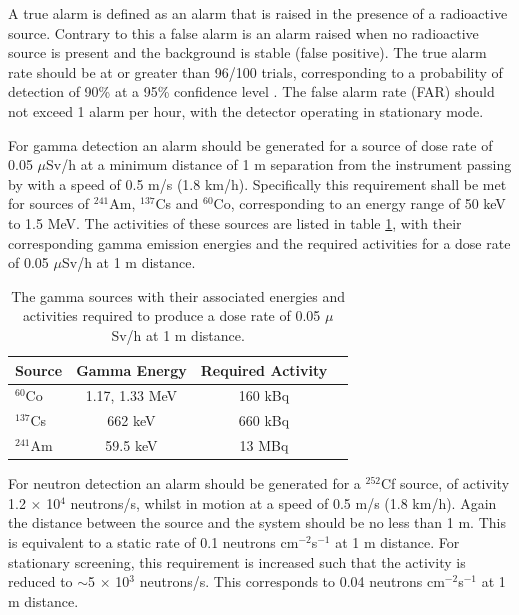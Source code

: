 A true alarm is defined as an alarm that is raised in the presence of a radioactive source. Contrary to this a false alarm is an alarm raised when no radioactive source is present and the background is stable (false positive). The true alarm rate should be at or greater than 96/100 trials, corresponding to a probability of detection of 90\% at a 95\% confidence level \cite{passFailStats}. The false alarm rate (FAR) should not exceed 1 alarm per hour, with the detector operating in stationary mode.

For gamma detection an alarm should be generated for a source of dose rate of 0.05 $\mu$Sv/h at a minimum distance of 1 m separation from the instrument passing by with a speed of 0.5 m/s (1.8 km/h). Specifically this requirement shall be met for sources of $^{241}$Am, $^{137}$Cs and $^{60}$Co, corresponding to an energy range of 50 keV to 1.5 MeV. The activities of these sources are listed in table \ref{tab:gammaSourcesDetection}, with their corresponding gamma  emission energies and the required activities for a dose rate of 0.05 $\mu$Sv/h at 1 m distance.

\begin{table}[!htbp]
\begin{center}
	\begin{tabular}{l*{2}{c}r}
	\hline
	 \hline
	 Source & Gamma Energy & Required Activity \\
    	\hline
    	$^{60}$Co	 & 1.17, 1.33 MeV &  160 kBq\\
    	$^{137}$Cs & 662 keV & 660 kBq \\
    	$^{241}$Am & 59.5 keV & 13 MBq \\
    	\hline
    	\hline
  	\end{tabular}
	\caption{The gamma sources with their associated energies and activities required to produce a dose rate of 0.05 $\mu$Sv/h at 1 m distance.}
    	\label{tab:gammaSourcesDetection}
\end{center}
\end{table}

For neutron detection an alarm should be generated for a $^{252}$Cf source, of activity 1.2 $\times$ 10$^{4}$ neutrons/s, whilst in motion at a speed of 0.5 m/s (1.8 km/h). Again the distance between the source and the system should be no less than 1 m. This is equivalent to a static rate of 0.1 neutrons cm$^{-2}$s$^{-1}$ at 1 m distance. For stationary screening, this requirement is increased such that the activity is reduced to $\sim$5 $\times$ 10$^{3}$ neutrons/s. This corresponds to 0.04 neutrons cm$^{-2}$s$^{-1}$ at 1 m distance. 


